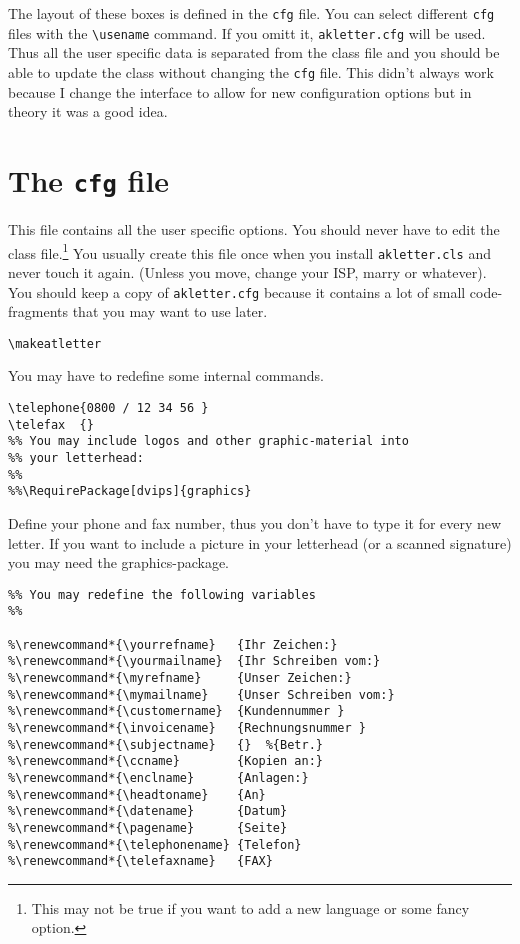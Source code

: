 \documentclass[a4paper]{article}
\begin{document}
The layout of these boxes is defined in the \texttt{cfg} file. You can
select different \texttt{cfg} files with the \verb+\usename+ command.
If you omitt it, \texttt{akletter.cfg} will be used. Thus all the user
specific data is separated from the class file and you should be able
to update the class without changing the \texttt{cfg} file. This
didn't always work because I change the interface to allow for new
configuration options but in theory it was a good idea.

\section{The \texttt{cfg} file}

This file contains all the user specific options. You should never 
have to edit the class file.\footnote{This may not be true if you want 
to add a new language or some fancy option.} You usually create this 
file once when you install \texttt{akletter.cls} and never touch it 
again. (Unless you move, change your ISP, marry or whatever). You 
should keep a copy of \texttt{akletter.cfg} because it contains a lot 
of small code-fragments that you may want to use later.

\begin{verbatim}
\makeatletter
\end{verbatim}

You may have to redefine some internal commands.

\begin{verbatim}
\telephone{0800 / 12 34 56 }
\telefax  {}
%% You may include logos and other graphic-material into
%% your letterhead:
%%
%%\RequirePackage[dvips]{graphics}
\end{verbatim}

Define your phone and fax number, thus you don't have to type it for 
every new letter. If you want to include a picture in your 
letterhead (or a scanned signature) you may need the graphics-package.

\begin{verbatim}
%% You may redefine the following variables
%%

%\renewcommand*{\yourrefname}   {Ihr Zeichen:}
%\renewcommand*{\yourmailname}  {Ihr Schreiben vom:}
%\renewcommand*{\myrefname}     {Unser Zeichen:}
%\renewcommand*{\mymailname}    {Unser Schreiben vom:}
%\renewcommand*{\customername}  {Kundennummer }
%\renewcommand*{\invoicename}   {Rechnungsnummer }
%\renewcommand*{\subjectname}   {}  %{Betr.}
%\renewcommand*{\ccname}        {Kopien an:}
%\renewcommand*{\enclname}      {Anlagen:}
%\renewcommand*{\headtoname}    {An}
%\renewcommand*{\datename}      {Datum}
%\renewcommand*{\pagename}      {Seite}
%\renewcommand*{\telephonename} {Telefon}
%\renewcommand*{\telefaxname}   {FAX}
\end{verbatim}
\end{document}
